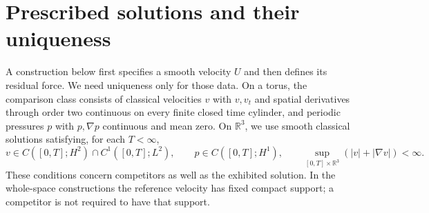 \section{Prescribed solutions and their uniqueness}\label{sec:analytic}
A construction below first specifies a smooth velocity $U$ and then defines its residual force. We need uniqueness only for those data. On a torus, the comparison class consists of classical velocities $v$ with $v,v_t$ and spatial derivatives through order two continuous on every finite closed time cylinder, and periodic pressures $p$ with $p,\nabla p$ continuous and mean zero. On $\mathbb R^3$, we use smooth classical solutions satisfying, for each $T<\infty$,
\begin{equation}\label{eq:comparison}
 v\in C([0,T];H^2)\cap C^1([0,T];L^2),\qquad
 p\in C([0,T];H^1),\qquad
 \sup_{[0,T]\times\mathbb R^3}(|v|+|\nabla v|)<\infty.
\end{equation}
These conditions concern competitors as well as the exhibited solution. In the whole-space constructions the reference velocity has fixed compact support; a competitor is not required to have that support.

